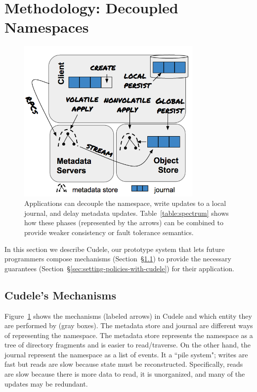 \section{Methodology: Decoupled Namespaces}

\begin{figure}[tb]
\caption{Applications can decouple the namespace, write updates to a local
journal, and delay metadata updates.  Table~\ref{table:spectrum} shows how
these phases (represented by the arrows) can be combined to provide weaker
consistency or fault tolerance semantics.  }\label{fig:decouple}
\centering
\includegraphics[width=90mm]{figures/fig-decouple.png}
\end{figure}

In this section we describe Cudele, our prototype system that lets future
programmers compose mechanisms (Section~\S\ref{sec:cudeles-mechanisms}) to
provide the necessary guarantees
(Section~\S\ref{sec:setting-policies-with-cudele}) for their application.

\subsection{Cudele's Mechanisms}
\label{sec:cudeles-mechanisms}

Figure~\ref{fig:decouple} shows the mechanisms (labeled arrows) in Cudele and
which entity they are performed by (gray boxes). The metadata store and journal
are different ways of representing the namespace. The metadata store represents
the namespace as a tree of directory fragments and is easier to read/traverse.
On the other hand, the journal represent the namespace as a list of events. It
a ``pile system"; writes are fast but reads are slow because state must be
reconstructed.  Specifically, reads are slow because there is more data to
read, it is unorganized, and many of the updates may be redundant.

